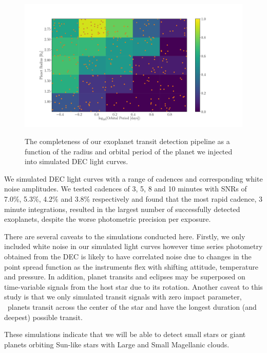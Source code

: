 \begin{figure}
  \caption{The completeness of our exoplanet transit detection pipeline as a
    function of the radius and orbital period of the planet we injected into
    simulated DEC light curves.
}
  \centering
    \includegraphics[width=.7\textwidth]{../completeness.pdf}
\label{fig:PGM}
\end{figure}

We simulated DEC light curves with a range of cadences and corresponding white
noise amplitudes.
We tested cadences of 3, 5, 8 and 10 minutes with SNRs of 7.0\%, 5.3\%, 4.2\%
and 3.8\% respectively and found that the most rapid cadence, 3 minute
integrations, resulted in the largest number of successfully detected
exoplanets, despite the worse photometric precision per exposure.


There are several caveats to the simulations conducted here.
Firstly, we only included white noise in our simulated light curves however
time series photometry obtained from the DEC is likely to have correlated
noise due to changes in the point spread function as the instruments flex with
shifting attitude, temperature and pressure.
In addition, planet transits and eclipses may be superposed on
time-variable signals from the host star due to its rotation.
Another caveat to this study is that we only simulated transit signals with
zero impact parameter, \ie\ planets transit across the center of the star and
have the longest duration (and deepest) possible transit.

These simulations indicate that we will be able to detect small stars or giant
planets orbiting Sun-like stars with Large and Small Magellanic clouds.
